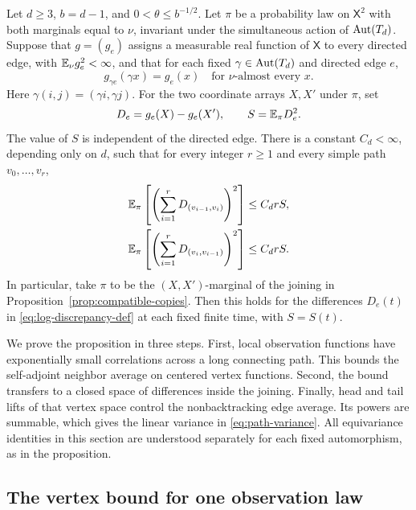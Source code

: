 \begin{proposition}
\label{prop:path-variance}
Let \(d\ge3\), \(b=d-1\), and \(0<\theta\le b^{-1/2}\).
Let \(\pi\) be a probability law on \(\mathsf X^2\) with both
marginals equal to \(\nu\), invariant under the simultaneous action
of \(\operatorname{Aut}(T_d)\).  Suppose that \(g=(g_e)\) assigns a measurable
real function of \(\mathsf X\) to every directed edge, with
\(\mathbb E_\nu g_e^2<\infty\), and that for each fixed
\(\gamma\in\operatorname{Aut}(T_d)\) and directed edge \(e\),
\[
 g_{\gamma e}(\gamma x)=g_e(x)
 \quad\text{for \(\nu\)-almost every \(x\)}.
\]
Here \(\gamma(i,j)=(\gamma i,\gamma j)\).
For the two coordinate arrays \(X,X'\) under \(\pi\), set
\[
 D_e=g_e(X)-g_e(X'),\qquad S=\mathbb E_\pi D_e^2.
\]
The value of \(S\) is independent of the directed edge.  There is a
constant \(C_d<\infty\), depending only on \(d\), such that for every
integer \(r\ge1\) and every simple path \(v_0,\ldots,v_r\),
\begin{equation}
\label{eq:path-variance}
 \begin{aligned}
 \mathbb E_\pi\left[\left(\sum_{i=1}^rD_{(v_{i-1},v_i)}\right)^2\right]
     &\le C_d rS,\\
 \mathbb E_\pi\left[\left(\sum_{i=1}^rD_{(v_i,v_{i-1})}\right)^2\right]
     &\le C_d rS.
 \end{aligned}
\end{equation}
In particular, take \(\pi\) to be the \((X,X')\)-marginal of the
joining in Proposition~\ref{prop:compatible-copies}.  Then this holds for the
differences \(D_e(t)\) in \eqref{eq:log-discrepancy-def} at each fixed
finite time, with \(S=S(t)\).
\end{proposition}

We prove the proposition in three steps.  First, local observation
functions have exponentially small correlations across a long
connecting path.  This bounds the self-adjoint neighbor average on
centered vertex functions.  Second, the bound transfers to a closed
space of differences inside the joining.  Finally, head and tail lifts
of that vertex space control the nonbacktracking edge average.  Its
powers are summable, which gives the linear variance in
\eqref{eq:path-variance}.  All equivariance identities in this section
are understood separately for each fixed automorphism, as in the
proposition.

\subsection{The vertex bound for one observation law}

